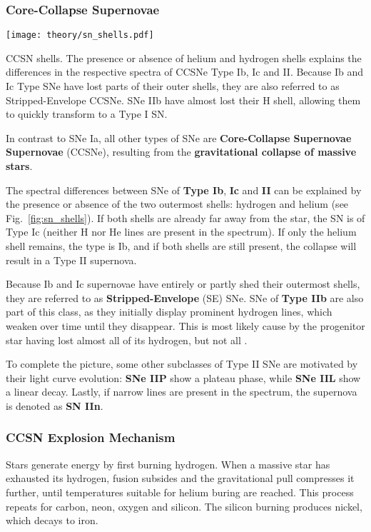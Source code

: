 \subsubsection{Core-Collapse Supernovae}\label{ccsne}

\begin{marginfigure}
    \texttt{[image: theory/sn\_shells.pdf]}
    \caption[CCSN shells]{CCSN shells. The presence or absence of helium and hydrogen shells explains the differences in the respective spectra of CCSNe Type Ib, Ic and II. Because Ib and Ic Type SNe have lost parts of their outer shells, they are also referred to as Stripped-Envelope CCSNe. SNe IIb have almost lost their H shell, allowing them to quickly transform to a Type I SN.}
\end{marginfigure}

In contrast to SNe Ia, all other types of SNe are \textbf{Core-Collapse Supernovae Supernovae} (CCSNe), resulting from the \textbf{gravitational collapse of massive stars}.

The spectral differences between SNe of \textbf{Type Ib}, \textbf{Ic} and \textbf{II} can be explained by the presence or absence of the two outermost shells: hydrogen and helium (see Fig.~\ref{fig:sn_shells}). If both shells are already far away from the star, the SN is of Type Ic (neither H nor He lines are present in the spectrum). If only the helium shell remains, the type is Ib, and if both shells are still present, the collapse will result in a Type II supernova.

Because Ib and Ic supernovae have entirely or partly shed their outermost shells, they are referred to as \textbf{Stripped-Envelope} (SE) SNe. SNe of \textbf{Type IIb} are also part of this class, as they initially display prominent hydrogen lines, which weaken over time until they disappear. This is most likely cause by the progenitor star having lost almost all of its hydrogen, but not all .

To complete the picture, some other subclasses of Type II SNe are motivated by their light curve evolution: \textbf{SNe IIP} show a plateau phase, while \textbf{SNe IIL} show a linear decay. Lastly, if narrow lines are present in the spectrum, the supernova is denoted as \textbf{SN IIn}.

\subsubsection{CCSN Explosion Mechanism}
Stars generate energy by first burning hydrogen. When a massive star has exhausted its hydrogen, fusion subsides and the gravitational pull compresses it further, until temperatures suitable for helium buring are reached. This process repeats for carbon, neon, oxygen and silicon. The silicon burning produces nickel, which decays to iron.

